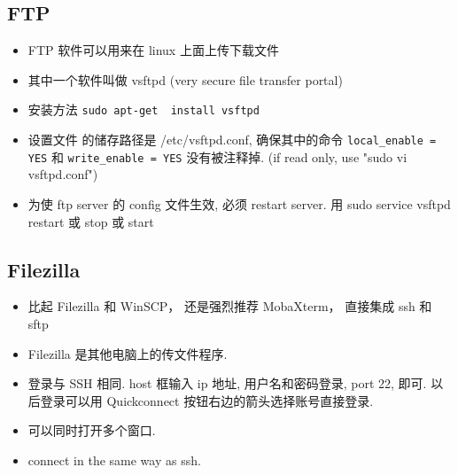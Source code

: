 
\subsection{FTP}
\begin{itemize}
\item FTP 软件可以用来在 linux 上面上传下载文件
\item 其中一个软件叫做 vsftpd (very secure file transfer portal)
\item 安装方法 \verb`sudo apt-get  install vsftpd`
\item 设置文件 的储存路径是 /etc/vsftpd.conf, 确保其中的命令 \verb|local_enable = YES| 和 \verb|write_enable = YES|  没有被注释掉.
(if read only, use "sudo vi vsftpd.conf")
\item 为使 ftp server 的 config 文件生效, 必须 restart server. 用 sudo service vsftpd restart 或 stop 或 start
\end{itemize}

\subsection{Filezilla}
\begin{itemize}
\item 比起 Filezilla 和 WinSCP， 还是强烈推荐 MobaXterm， 直接集成 ssh 和 sftp
\item Filezilla 是其他电脑上的传文件程序.
\item 登录与 SSH 相同. host 框输入 ip 地址, 用户名和密码登录, port 22, 即可. 以后登录可以用 Quickconnect 按钮右边的箭头选择账号直接登录.
\item 可以同时打开多个窗口.
\item connect in the same way as ssh.
\end{itemize}

